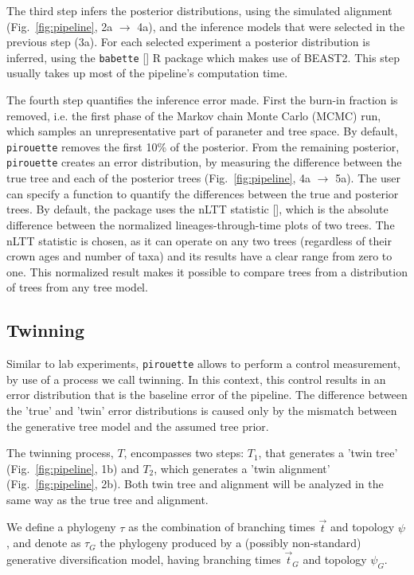 The third step infers the posterior distributions,
using the simulated alignment (Fig.~\ref{fig:pipeline}, 2a $\rightarrow$ 4a),
and the inference models that were selected in the previous step (3a). 
For each selected experiment a posterior distribution is inferred, using the 
\verb;babette; [\cite{bilderbeek2018babette}] R package which makes use of BEAST2. 
This step usually takes up most of the pipeline's computation time.

The fourth step quantifies the inference error made. 
First the burn-in fraction is removed, i.e. the first phase of the 
Markov chain Monte Carlo (MCMC) run,
which samples an unrepresentative part of paraneter and tree space. 
By default, \verb;pirouette; 
removes the first 10\% of the posterior.
From the remaining posterior, \verb;pirouette; 
creates an error distribution, by measuring the difference
between the true tree and each of the posterior 
trees (Fig.~\ref{fig:pipeline}, 4a $\rightarrow$ 5a).
The user can specify a function to quantify the differences between
the true and posterior trees. By default, the package uses the nLTT 
statistic [\cite{janzen2015approximate}], which is the absolute difference
between the normalized lineages-through-time plots of two trees.
The nLTT statistic is chosen, as it can operate on any two trees (regardless
of their crown ages and number of taxa) and its results have a clear range
from zero to one. This normalized result makes it possible to compare trees 
from a distribution of trees from any tree model.

\subsection{Twinning}\label{subsec:twinning}

Similar to lab experiments, \verb;pirouette; allows to perform
a control measurement, by use of a process we call twinning. 
In this context, this control results in an error distribution
that is the baseline error of the pipeline. The difference
between the 'true' and 'twin' error distributions is caused only
by the mismatch between the generative tree model and the assumed
tree prior.

The twinning process, $T$, encompasses two steps:
$T_1$, that generates a 'twin tree' (Fig.~\ref{fig:pipeline}, 1b) 
and $T_2$, which generates a 'twin alignment' (Fig.~\ref{fig:pipeline}, 2b).
Both twin tree and alignment will be analyzed in the same way 
as the true tree and alignment.

We define a phylogeny $\tau$ as the combination of
branching times $\Vec{t}$ and topology $\psi$, 
and denote as $\tau_{\mathit{G}}$ the phylogeny 
produced by a (possibly non-standard) generative diversification model, 
having branching times $\Vec{t}_{\mathit{G}}$ and 
topology $\psi_{\mathit{G}}$.

